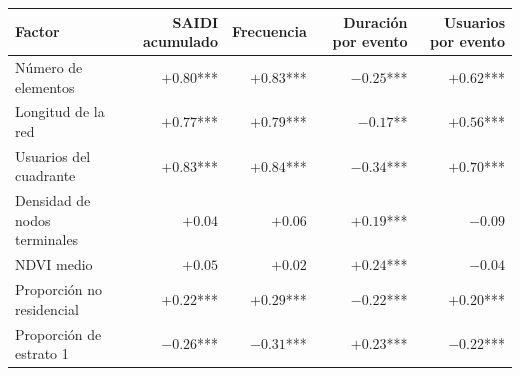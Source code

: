 \begin{tabular}{l r r r r}
\toprule
\textbf{Factor} & \textbf{SAIDI acumulado} & \textbf{Frecuencia} & \textbf{Duración por evento} & \textbf{Usuarios por evento} \\
\midrule
Número de elementos & $+0{.}80$*** & $+0{.}83$*** & $-0{.}25$*** & $+0{.}62$*** \\
Longitud de la red & $+0{.}77$*** & $+0{.}79$*** & $-0{.}17$** & $+0{.}56$*** \\
Usuarios del cuadrante & $+0{.}83$*** & $+0{.}84$*** & $-0{.}34$*** & $+0{.}70$*** \\
Densidad de nodos terminales & $+0{.}04$ & $+0{.}06$ & $+0{.}19$*** & $-0{.}09$ \\
NDVI medio & $+0{.}05$ & $+0{.}02$ & $+0{.}24$*** & $-0{.}04$ \\
Proporción no residencial & $+0{.}22$*** & $+0{.}29$*** & $-0{.}22$*** & $+0{.}20$*** \\
Proporción de estrato 1 & $-0{.}26$*** & $-0{.}31$*** & $+0{.}23$*** & $-0{.}22$*** \\
\bottomrule
\end{tabular}
